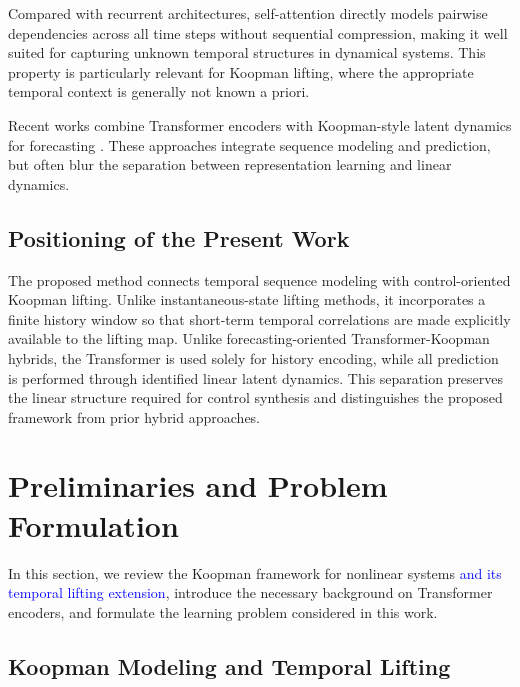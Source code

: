 \documentclass[journal]{IEEEtran}
\begin{document}
Compared with recurrent architectures, self-attention directly models pairwise dependencies across all time steps without sequential compression, making it well suited for capturing unknown temporal structures in dynamical systems. This property is particularly relevant for Koopman lifting, where the appropriate temporal context is generally not known a priori.

Recent works combine Transformer encoders with Koopman-style latent dynamics for forecasting \cite{forootani2026deepkoopformer, forootani2026spectral}. These approaches integrate sequence modeling and prediction, but often blur the separation between representation learning and linear dynamics.

\subsection{Positioning of the Present Work}
\label{subsec:positioning}

The proposed method connects temporal sequence modeling with control-oriented Koopman lifting. Unlike instantaneous-state lifting methods, it incorporates a finite history window so that short-term temporal correlations are made explicitly available to the lifting map. Unlike forecasting-oriented Transformer-Koopman hybrids, the Transformer is used solely for history encoding, while all prediction is performed through identified linear latent dynamics. This separation preserves the linear structure required for control synthesis and distinguishes the proposed framework from prior hybrid approaches.

\section{Preliminaries and Problem Formulation}
\label{sec:preliminaries_and_problem}

In this section, we review the Koopman framework for nonlinear systems \textcolor{blue}{and its temporal lifting extension}, introduce the necessary background on Transformer encoders, and formulate the learning problem considered in this work.

\subsection{Koopman Modeling and Temporal Lifting}
\label{sec:preliminary}
\end{document}
